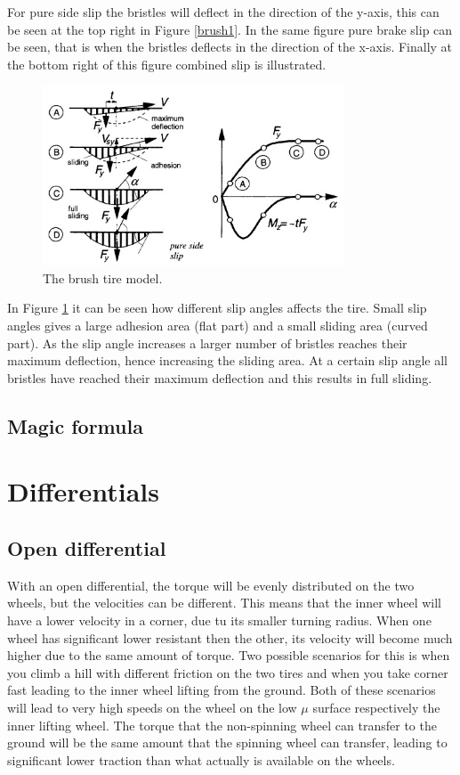 For pure side slip the bristles will deflect in the direction of the y-axis, this can be seen at the top right in Figure \ref{brush1}. In the same figure pure brake slip can be seen, that is when the bristles deflects in the direction of the x-axis. Finally at the bottom right of this figure combined slip is illustrated.

\begin{figure}[h]
	\centering
	\includegraphics[width=0.8\textwidth]{Pictures/brush2}
	\caption{The brush tire model. \cite{pacejka}}
	\label{brush2}
\end{figure}

In Figure \ref{brush2} it can be seen how different slip angles affects the tire. Small slip angles gives a large adhesion area (flat part) and a small sliding area (curved part). As the slip angle increases a larger number of bristles reaches their maximum deflection, hence increasing the sliding area. At a certain slip angle all bristles have reached their maximum deflection and this results in full sliding. 

\subsection{Magic formula}

\section{Differentials}

\subsection{Open differential}

With an open differential, the torque will be evenly distributed on the two wheels, but the velocities can be different. This means that the inner wheel will have a lower velocity in a corner, due tu its smaller turning radius. When one wheel has significant lower resistant then the other, its velocity will become much higher due to the same amount of torque. Two possible scenarios for this is when you climb a hill with different friction on the two tires and when you take corner fast leading to the inner wheel lifting from the ground. Both of these scenarios will lead to very high speeds on the wheel on the low $ \mu $ surface respectively the inner lifting wheel. The torque that the non-spinning wheel can transfer to the ground will be the same amount that the spinning wheel can transfer, leading to significant lower traction than what actually is available on the wheels.

